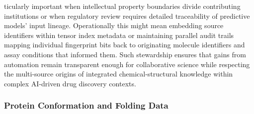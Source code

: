 \documentclass[
]{article}
\begin{document}
ticularly important when intellectual property boundaries divide
contributing institutions or when regulatory review requires detailed
traceability of predictive models' input lineage. Operationally this
might mean embedding source identifiers within tensor index metadata or
maintaining parallel audit trails mapping individual fingerprint bits
back to originating molecule identifiers and assay conditions that
informed them. Such stewardship ensures that gains from automation
remain transparent enough for collaborative science while respecting the
multi-source origins of integrated chemical-structural knowledge within
complex AI-driven drug discovery contexts.

\hypertarget{protein-conformation-and-folding-data}{%
\subsubsection{Protein Conformation and Folding
Data}\label{protein-conformation-and-folding-data}}
\end{document}
